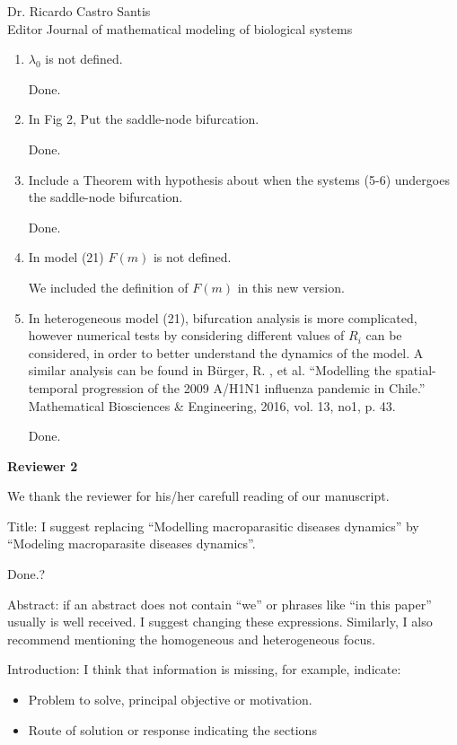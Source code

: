 \documentclass [12pt]{letter}
\begin{document}
\begin{letter}{Dr. Ricardo Castro Santis\\ Editor Journal of mathematical modeling of biological systems}
\begin{enumerate}
{		We included a paragraph following the reviewer advice.
		}
		
		\item $\lambda_0$ is not defined.
		
		Done.
		
		\item In Fig 2, Put the saddle-node bifurcation.
		
		Done.	
		
		\item Include a Theorem with hypothesis about when the systems (5-6) undergoes the
		saddle-node bifurcation.
		
		Done.
		
		\item In model (21) $F (m)$ is not defined.
		
		We included the definition of $F(m)$ in this new version.
		
		\item In heterogeneous model (21), bifurcation analysis is more complicated, however
		numerical tests by considering different values of $R_i$ can be considered, in order to
		better understand the dynamics of the model. A similar analysis can be found in
		B\"urger, R. , et al. ``Modelling the spatial-temporal progression of the 2009 A/H1N1 influenza pandemic in Chile.” Mathematical Biosciences \& Engineering, 2016, vol.	13, no1, p. 43.
		
		Done.
\end{enumerate}

\newpage	

\textbf{Reviewer 2}
	
We thank the reviewer for his/her carefull reading of our manuscript.	

\begin{enumerate}
	{\color{red}
	\item Title: I suggest replacing “Modelling macroparasitic diseases dynamics” by
	“Modeling macroparasite diseases dynamics”.
	
	Done.?
	}
	
	{\color{red}
	\item Abstract: if an abstract does not contain “we” or phrases like “in this paper”
	usually is well received. I suggest changing these expressions. Similarly, I also
	recommend mentioning the homogeneous and heterogeneous focus.
	}
	
	
	{\color{red}
	\item Introduction: I think that information is missing, for example, indicate:
	\begin{itemize}
	\item Problem to solve, principal objective or motivation.	
	\item Route of solution or response indicating the sections
	\end{itemize}
	}
	

\end{enumerate}
\end{letter}
\end{document}
